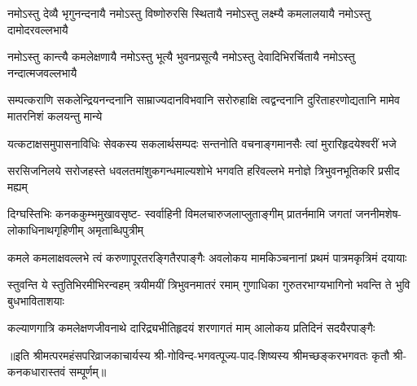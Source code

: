 \fourlineindentedshloka
{नमोऽस्तु देव्यै भृगुनन्दनायै}
{नमोऽस्तु विष्णोरुरसि स्थितायै}
{नमोऽस्तु लक्ष्म्यै कमलालयायै}
{नमोऽस्तु दामोदरवल्लभायै}

\fourlineindentedshloka
{नमोऽस्तु कान्त्यै कमलेक्षणायै}
{नमोऽस्तु भूत्यै भुवनप्रसूत्यै}
{नमोऽस्तु देवादिभिरर्चितायै}
{नमोऽस्तु नन्दात्मजवल्लभायै}

\fourlineindentedshloka
{सम्पत्कराणि सकलेन्द्रियनन्दनानि}
{साम्राज्यदानविभवानि सरोरुहाक्षि}
{त्वद्वन्दनानि दुरिताहरणोद्यतानि}
{मामेव मातरनिशं कलयन्तु मान्ये}

\fourlineindentedshloka
{यत्कटाक्षसमुपासनाविधिः}
{सेवकस्य सकलार्थसम्पदः}
{सन्तनोति वचनाङ्गमानसैः}
{त्वां मुरारिहृदयेश्वरीं भजे}

\fourlineindentedshloka
{सरसिजनिलये सरोजहस्ते}
{धवलतमांशुकगन्धमाल्यशोभे}
{भगवति हरिवल्लभे मनोज्ञे}
{त्रिभुवनभूतिकरि प्रसीद मह्यम्}

\fourlineindentedshloka
{दिग्घस्तिभिः कनककुम्भमुखावसृष्ट-}
{स्वर्वाहिनी विमलचारुजलाप्लुताङ्गीम्}
{प्रातर्नमामि जगतां जननीमशेष-}
{लोकाधिनाथगृहिणीम् अमृताब्धिपुत्रीम्}

\fourlineindentedshloka
{कमले कमलाक्षवल्लभे त्वं}
{करुणापूरतरङ्गितैरपाङ्गैः}
{अवलोकय मामकिञ्चनानां}
{प्रथमं पात्रमकृत्रिमं दयायाः}

\fourlineindentedshloka
{स्तुवन्ति ये स्तुतिभिरमीभिरन्वहम्}
{त्रयीमयीं त्रिभुवनमातरं रमाम्}
{गुणाधिका गुरुतरभाग्यभागिनो}
{भवन्ति ते भुवि बुधभाविताशयाः}

{कल्याणगात्रि कमलेक्षणजीवनाथे}
{दारिद्र्यभीतिहृदयं शरणागतं माम्}
{आलोकय प्रतिदिनं सदयैरपाङ्गैः}

॥इति  श्रीमत्परमहंसपरिव्राजकाचार्यस्य श्री-गोविन्द-भगवत्पूज्य-पाद-शिष्यस्य
श्रीमच्छङ्करभगवतः कृतौ श्री-कनकधारास्तवं सम्पूर्णम्॥